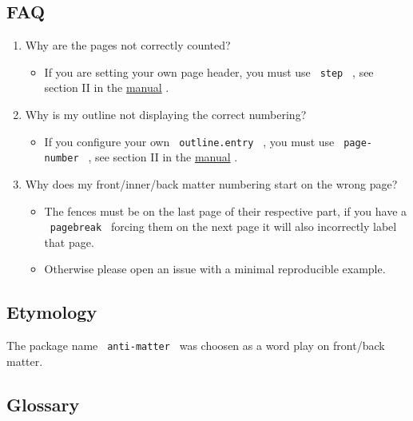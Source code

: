 \subsection{FAQ}\label{faq}

\begin{enumerate}
\tightlist
\item
  Why are the pages not correctly counted?

  \begin{itemize}
  \tightlist
  \item
    If you are setting your own page header, you must use
    \texttt{\ step\ } , see section II in the
    \href{https://github.com/typst/packages/raw/main/packages/preview/anti-matter/0.1.1/docs/manual.pdf}{manual}
    .
  \end{itemize}
\item
  Why is my outline not displaying the correct numbering?

  \begin{itemize}
  \tightlist
  \item
    If you configure your own \texttt{\ outline.entry\ } , you must use
    \texttt{\ page-number\ } , see section II in the
    \href{https://github.com/typst/packages/raw/main/packages/preview/anti-matter/0.1.1/docs/manual.pdf}{manual}
    .
  \end{itemize}
\item
  Why does my front/inner/back matter numbering start on the wrong page?

  \begin{itemize}
  \tightlist
  \item
    The fences must be on the last page of their respective part, if you
    have a \texttt{\ pagebreak\ } forcing them on the next page it will
    also incorrectly label that page.
  \item
    Otherwise please open an issue with a minimal reproducible example.
  \end{itemize}
\end{enumerate}

\subsection{Etymology}\label{etymology}

The package name \texttt{\ anti-matter\ } was choosen as a word play on
front/back matter.

\subsection{Glossary}\label{glossary}

